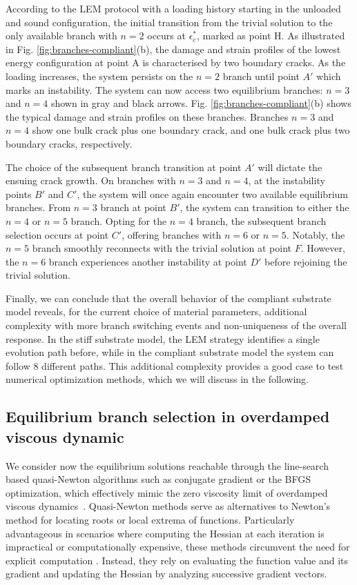 According to the LEM protocol with a loading history starting in the unloaded and sound configuration, the initial transition from the trivial solution to the only available branch with $n=2$ occurs at $\epsilon_c^*$, marked as point H. As illustrated in Fig. \ref{fig:branches-compliant}(b), the damage and strain profiles of the lowest energy configuration at point A is characterised by two boundary cracks. As the loading increases, the system persists on the $n=2$ branch until point $A'$ which marks an instability. The system can now access two equilibrium branches: $n=3$ and $n=4$ shown in gray and black arrows. Fig. \ref{fig:branches-compliant}(b) shows the typical damage and strain profiles on these branches. Branches $n=3$ and $n=4$ show one bulk crack plus one boundary crack, and one bulk crack plus two boundary cracks, respectively. 

The choice of the subsequent branch transition at point $A'$ will dictate the ensuing crack growth. On branches with $n=3$ and $n=4$, at the instability points $B'$ and $C'$, the system will once again encounter two available equilibrium branches. From $n=3$ branch  at point $B'$, the system can transition to either the $n=4$ or $n=5$ branch. Opting for the $n=4$ branch, the subsequent branch selection occurs at point $C'$, offering branches with $n=6$ or $n=5$. Notably, the $n=5$ branch smoothly reconnects with the trivial solution at point $F$. However, the $n=6$ branch experiences another instability at point $D'$ before rejoining the trivial solution. 

Finally, we can conclude that the overall behavior of the compliant substrate model reveals, for the current choice of material parameters, additional complexity with more branch switching events and non-uniqueness of the overall response. In the stiff substrate model, the LEM strategy identifies a single evolution path before, while in the compliant substrate model the system can follow 8 different paths. This additional complexity provides a good case to test numerical optimization methods, which we will discuss in the following.

\subsection{Equilibrium branch selection in overdamped viscous dynamic}
We consider now the equilibrium solutions reachable through the line-search based quasi-Newton algorithms such as  conjugate gradient or the BFGS optimization, which effectively  mimic the zero viscosity limit of overdamped viscous dynamics~\cite{SALMAN2012219}. Quasi-Newton methods serve as alternatives to Newton's method for locating roots or local extrema of functions. Particularly advantageous in scenarios where computing the Hessian at each iteration is impractical or computationally expensive, these methods circumvent the need for explicit computation . Instead, they rely on evaluating the function value and its gradient and updating the Hessian by analyzing successive gradient vectors.

